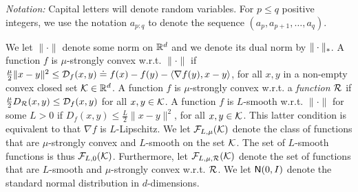
\textit{Notation:} Capital letters will denote random variables.
For $p\le q$ positive integers,
 we use the notation $a_{p:q}$ to denote
 the sequence $(a_p,a_{p+1}, \dots, a_{q})$.

 We let $\| \cdot \|$ denote some norm on $\mathbb{R}^d$ and we denote its dual norm by $\|\cdot\|_*$.
 A function $f$ is $\mu$-strongly convex w.r.t. $\| \cdot \|$  if
 $\tfrac{\mu}{2} \|x-y\|^2 \le \mathcal{D}_f(x,y)\doteq f(x)-f(y)-\langle \nabla f(y),x-y \rangle$, for all $x,y$ in a non-empty convex closed set $\mathcal{K} \in \mathbb{R}^d$.
A function $f$ is $\mu$-strongly convex w.r.t. a \emph{function} $\mathcal{R}$
	if $\tfrac{\mu}{2}D_{\mathcal{R}}(x,y)\le\mathcal{D}_f(x,y)$ for all $x,y \in \mathcal{K}$.
 A function $f$ is $L$-smooth w.r.t. $\| \cdot \|$ for some $L>0$ if
$ D_f(x,y) \le \tfrac{L}{2} \|x-y\|^2$, for all $x,y \in \mathcal{K}$.
 This latter condition is equivalent to that $\nabla f$ is $L$-Lipschitz.
 We let $\mathcal{F}_{L,\mu}(\mathcal{K})$ denote the class of functions that are $\mu$-strongly convex and $L$-smooth on the set $\mathcal{K}$.
 The set of $L$-smooth functions is thus $\mathcal{F}_{L,0}(\mathcal{K})$. Furthermore, let $\mathcal{F}_{L,\mu,\mathcal{R}}(\mathcal{K})$ denote the set of functions that are  $L$-smooth and $\mu$-strongly convex w.r.t. $\mathcal{R}$.
 We let $\mathsf{N}(0, I)$ denote the standard normal distribution in $d$-dimensions.



